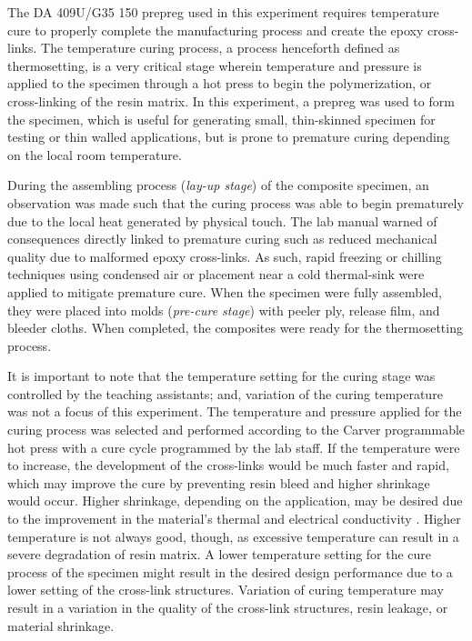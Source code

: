 \tab The DA 409U/G35 150 prepreg used in this experiment requires temperature cure to properly complete the manufacturing process and create the epoxy cross-links.  The temperature curing process, a process henceforth defined as thermosetting, is a very critical stage wherein temperature and pressure is applied to the specimen through a hot press to begin the polymerization, or cross-linking of the resin matrix.  In this experiment, a prepreg was used to form the specimen, which is useful for generating small, thin-skinned specimen for testing or thin walled applications, but is prone to premature curing depending on the local room temperature.

During the assembling process (\textit{lay-up stage}) of the composite specimen, an observation was made such that the curing process was able to begin prematurely due to the local heat generated by physical touch.  The lab manual warned of consequences directly linked to premature curing such as reduced mechanical quality due to malformed epoxy cross-links.  As such, rapid freezing or chilling techniques using condensed air or placement near a cold thermal-sink were applied to mitigate premature cure.  When the specimen were fully assembled, they were placed into molds (\textit{pre-cure stage}) with peeler ply, release film, and bleeder cloths.  When completed, the composites were ready for the thermosetting process.

\newpage
It is important to note that the temperature setting for the curing stage was controlled by the teaching assistants; and, variation of the curing temperature was not a focus of this experiment.  The temperature and pressure applied for the curing process was selected and performed according to the Carver programmable hot press with a cure cycle programmed by the lab staff.  If the temperature were to increase, the development of the cross-links would be much faster and rapid, which may improve the cure by preventing resin bleed and higher shrinkage would occur.  Higher shrinkage, depending on the application, may be desired due to the improvement in the material's thermal and electrical conductivity \cite{curematters}.  Higher temperature is not always good, though, as excessive temperature can result in a severe degradation of resin matrix.\cite{boeingcuring}  A lower temperature setting for the cure process of the specimen might result in the desired design performance due to a lower setting of the cross-link structures.  Variation of curing temperature may result in a variation in the quality of the cross-link structures, resin leakage, or material shrinkage.